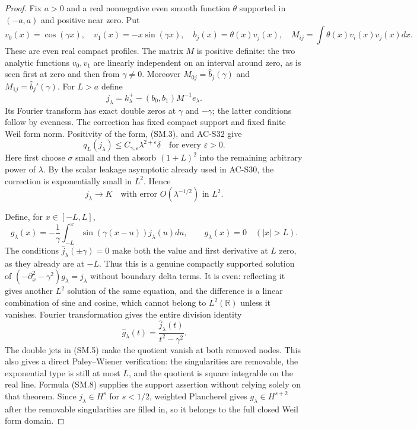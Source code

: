 \begin{proof}
Fix $a>0$ and a real nonnegative even smooth function
$\theta$ supported in $(-a,a)$ and positive near zero.
Put
\[
 v_0(x)=\cos(\gamma x),\quad
 v_1(x)=-x\sin(\gamma x),\quad
 b_j(x)=\theta(x)v_j(x),\quad
 M_{ij}=\int\theta(x)v_i(x)v_j(x)dx.              \tag{SM.4}
\]
These are even real compact profiles.
The matrix $M$ is positive definite: the two analytic
functions $v_0,v_1$ are linearly independent on an
interval around zero, as is seen first at zero and
then from $\gamma\ne0$.
Moreover $M_{0j}=\widehat b_j(\gamma)$ and
$M_{1j}=\widehat b_j'(\gamma)$.
For $L>a$ define
\[
        j_\lambda=k_\lambda^+
                    -(b_0,b_1)M^{-1}e_\lambda.     \tag{SM.5}
\]
Its Fourier transform has exact double zeros at
$\gamma$ and $-\gamma$; the latter conditions follow
by evenness.  The correction has fixed compact
support and fixed finite Weil form norm.
Positivity of the form, (SM.3), and AC-S32 give
\[
 q_L(j_\lambda)
       \leq C_{\gamma,\varepsilon}
                                  \lambda^{2+\varepsilon}\delta
                      \quad\text{for every }\varepsilon>0.
                                                        \tag{SM.6}
\]
Here first choose $\sigma$ small and then absorb
$(1+L)^2$ into the remaining arbitrary power of
$\lambda$.  By the scalar leakage asymptotic already
used in AC-S30, the correction is exponentially
small in $L^2$.  Hence
\[
                     j_\lambda\longrightarrow K
            \quad\text{with error }O(\lambda^{-1/2})\text{ in }L^2.
                                                        \tag{SM.7}
\]

Define, for $x\in[-L,L]$,
\[
 g_\lambda(x)=-\frac1\gamma
                  \int_{-L}^{x}\sin(\gamma(x-u))j_\lambda(u)du,
 \qquad g_\lambda(x)=0\quad(|x|>L).                \tag{SM.8}
\]
The conditions $\widehat j_\lambda(\pm\gamma)=0$
make both the value and first derivative at $L$
zero, as they already are at $-L$.
Thus this is a genuine compactly supported solution
of $(-\partial_x^2-\gamma^2)g_\lambda=j_\lambda$
without boundary delta terms.  It is even: reflecting
it gives another $L^2$ solution of the same equation,
and the difference is a linear combination of sine
and cosine, which cannot belong to $L^2(\mathbb R)$
unless it vanishes.
Fourier transformation gives the entire division
identity
\[
       \widehat g_\lambda(t)
           =\frac{\widehat j_\lambda(t)}{t^2-\gamma^2}.
                                                        \tag{SM.9}
\]
The double jets in (SM.5) make the quotient vanish
at both removed nodes.  This also gives a direct
Paley--Wiener verification: the singularities are
removable, the exponential type is still at most
$L$, and the quotient is square integrable on the
real line.  Formula (SM.8) supplies the support
assertion without relying solely on that theorem.
Since $j_\lambda\in H^s$ for $s<1/2$, weighted Plancherel gives
$g_\lambda\in H^{s+2}$ after the removable singularities
are filled in, so it belongs to the full
closed Weil form domain.


\end{proof}
